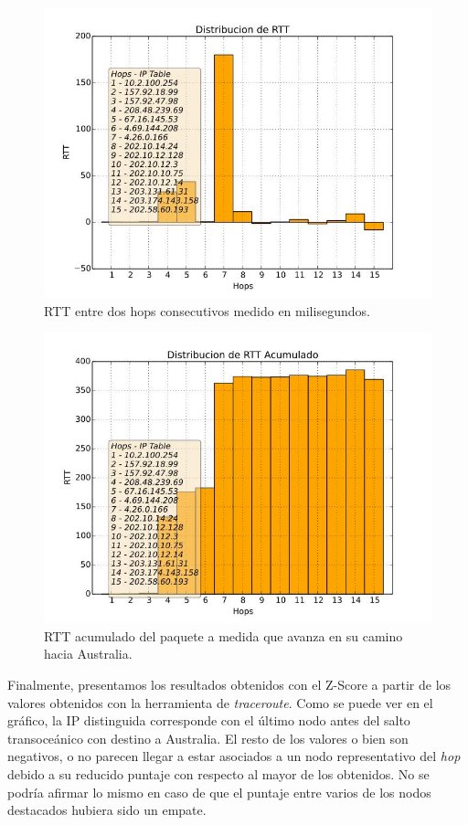 \begin{figure}[H]
  \centering	
	\includegraphics[scale=0.5]{../australia-experiment/bar_rtt.jpeg}
  \caption{RTT entre dos hops consecutivos medido en milisegundos.}
	\label{fig:histo-src-sitiotrabajo}
\end{figure}

\begin{figure}[H]
  \centering	
	\includegraphics[scale=0.5]{../australia-experiment/bar_rtt_acum.jpeg}
  \caption{RTT acumulado del paquete a medida que avanza en su camino hacia Australia.}
	\label{fig:histo-src-sitiotrabajo}
\end{figure}

Finalmente, presentamos los resultados obtenidos con el Z-Score a partir de los valores obtenidos con la herramienta de \textit{traceroute}. Como se puede ver en el gráfico, la IP distinguida corresponde con el último nodo antes del salto transoceánico con destino a Australia. El resto de los valores o bien son negativos, o no parecen llegar a estar asociados a un nodo representativo del \textit{hop} debido a su reducido puntaje con respecto al mayor de los obtenidos. No se podría afirmar lo mismo en caso de que el puntaje entre varios de los nodos destacados hubiera sido un empate. 

